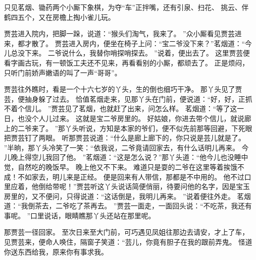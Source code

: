 只见茗烟、锄药两个小厮下象棋，为夺“车”正拌嘴，还有引泉、扫花、
挑云、伴鹤四五个，又在房檐上掏小雀儿玩。
\par
贾芸进入院内，把脚一跺，说道：“猴头们淘气，我来了。
”众小厮看见贾芸进来，都才散了。
贾芸进入房内，便坐在椅子上问：“宝二爷没下来？”茗烟道：“今儿总没下来。
二爷说什么，我替你哨探哨探去。
”说着，便出去了。
这里贾芸便看字画古玩，有一顿饭工夫还不见来，再看看别的小厮，都顽去了。
正是烦闷，只听门前娇声嫩语的叫了一声“哥哥”。
\par
贾芸往外瞧时，看是一个十六七岁的丫头，生的倒也细巧干净。
那丫头见了贾芸，便抽身躲了过去。
恰值茗烟走来，见那丫头在门前，便说道：“好，好，正抓不着个信儿。
”贾芸见了茗烟，也就赶了出来，问怎么样。
茗烟道：“等了这一日，也没个人儿过来。
这就是宝二爷房里的。
好姑娘，你进去带个信儿，就说廊上的二爷来了。
”那丫头听说，方知是本家的爷们，便不似先前那等回避，下死眼把贾芸钉了两眼。
听那贾芸说道：“什么是廊上廊下的，你只说是芸儿就是了。
”半晌，那丫头冷笑了一笑：“依我说，二爷竟请回家去，有什么话明儿再来。
今儿晚上得空儿我回了他。
”茗烟道：“这是怎么说？”那丫头道：“他今儿也没睡中觉，自然吃的晚饭早。
晚上他又不下来。
难道只是耍的二爷在这里等着挨饿不成！不如家去，明儿来是正经。
便是回来有人带信，那都是不中用的。
他不过口里应着，他倒给带呢！”贾芸听这丫头说话简便俏丽，待要问他的名字，因是宝玉房里的，又不便问，只得说道：“这话倒是，我明儿再来。
”说着便往外走。
茗烟道：“我倒茶去，二爷吃了茶再去。
”贾芸一面走，一面回头说：“不吃茶，我还有事呢。
”口里说话，眼睛瞧那丫头还站在那里呢。
\par
那贾芸一径回家。
至次日来至大门前，可巧遇见凤姐往那边去请安，才上了车，见贾芸来，便命人唤住，隔窗子笑道：“芸儿，你竟有胆子在我的跟前弄鬼。
怪道你送东西给我，原来你有事求我。
